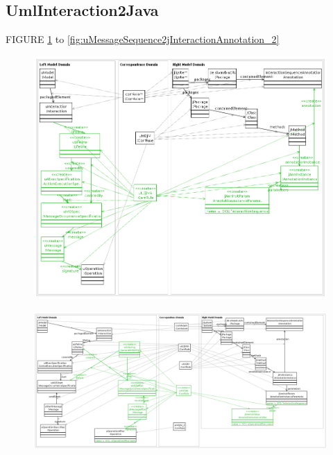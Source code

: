 \documentclass[tuberlin,cic,tc,english,noabntcite]{iiufrgs}
\begin{document}
\subsection{UmlInteraction2Java}
FIGURE \ref{fig:uILifeline2jMAnnotation} to \ref{fig:uMessageSequence2jInteractionAnnotation_2}

\begin{figure}[h]
    \caption{}
    \begin{center}
        \includegraphics[width=40em]{uILifeline2jMAnnotation}
    \end{center}
    \label{fig:uILifeline2jMAnnotation}
\end{figure}
\begin{figure}[h]
    \caption{}
    \begin{center}
        \includegraphics[width=40em]{uMessageSequence2jInteractionAnnotation}
    \end{center}
    \label{fig:uMessageSequence2jInteractionAnnotation}
\end{figure}
\end{document}
